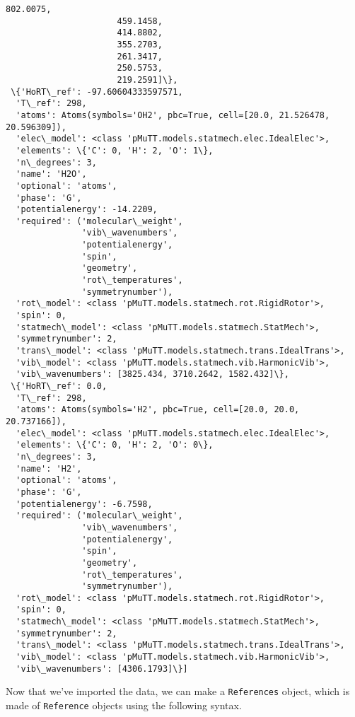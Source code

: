 \documentclass[11pt]{article}
\begin{document}
\begin{Verbatim}[commandchars=\\\{\}]
                      802.0075,
                      459.1458,
                      414.8802,
                      355.2703,
                      261.3417,
                      250.5753,
                      219.2591]\},
 \{'HoRT\_ref': -97.60604333597571,
  'T\_ref': 298,
  'atoms': Atoms(symbols='OH2', pbc=True, cell=[20.0, 21.526478, 20.596309]),
  'elec\_model': <class 'pMuTT.models.statmech.elec.IdealElec'>,
  'elements': \{'C': 0, 'H': 2, 'O': 1\},
  'n\_degrees': 3,
  'name': 'H2O',
  'optional': 'atoms',
  'phase': 'G',
  'potentialenergy': -14.2209,
  'required': ('molecular\_weight',
               'vib\_wavenumbers',
               'potentialenergy',
               'spin',
               'geometry',
               'rot\_temperatures',
               'symmetrynumber'),
  'rot\_model': <class 'pMuTT.models.statmech.rot.RigidRotor'>,
  'spin': 0,
  'statmech\_model': <class 'pMuTT.models.statmech.StatMech'>,
  'symmetrynumber': 2,
  'trans\_model': <class 'pMuTT.models.statmech.trans.IdealTrans'>,
  'vib\_model': <class 'pMuTT.models.statmech.vib.HarmonicVib'>,
  'vib\_wavenumbers': [3825.434, 3710.2642, 1582.432]\},
 \{'HoRT\_ref': 0.0,
  'T\_ref': 298,
  'atoms': Atoms(symbols='H2', pbc=True, cell=[20.0, 20.0, 20.737166]),
  'elec\_model': <class 'pMuTT.models.statmech.elec.IdealElec'>,
  'elements': \{'C': 0, 'H': 2, 'O': 0\},
  'n\_degrees': 3,
  'name': 'H2',
  'optional': 'atoms',
  'phase': 'G',
  'potentialenergy': -6.7598,
  'required': ('molecular\_weight',
               'vib\_wavenumbers',
               'potentialenergy',
               'spin',
               'geometry',
               'rot\_temperatures',
               'symmetrynumber'),
  'rot\_model': <class 'pMuTT.models.statmech.rot.RigidRotor'>,
  'spin': 0,
  'statmech\_model': <class 'pMuTT.models.statmech.StatMech'>,
  'symmetrynumber': 2,
  'trans\_model': <class 'pMuTT.models.statmech.trans.IdealTrans'>,
  'vib\_model': <class 'pMuTT.models.statmech.vib.HarmonicVib'>,
  'vib\_wavenumbers': [4306.1793]\}]

    \end{Verbatim}

    Now that we've imported the data, we can make a \texttt{References}
object, which is made of \texttt{Reference} objects using the following
syntax.
\end{document}
